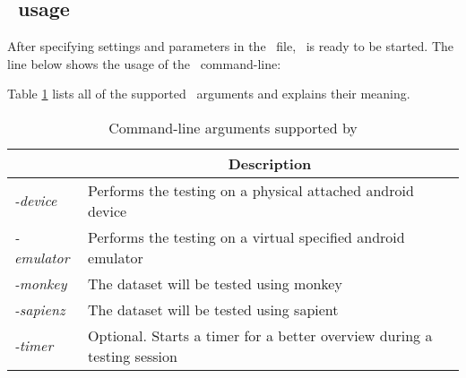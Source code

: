 \subsection{\toolname\ usage}
After specifying settings and parameters in the \Config\ file, \toolname\ is ready to be started. 
The line below shows the usage of the \toolname\ command-line: 
\begin{center}
\end{center}
Table \ref{tbl: toolarguments} lists all of the supported \toolname\ arguments and explains their meaning. 
\begin{table}[tb]
\centering
\caption{Command-line arguments supported by \toolname}
\label{tbl: toolarguments}
\begin{tabular}{|l|l|}
\hline
\rowcolor[HTML]{EFEFEF} 
\multicolumn{1}{|c|}{\cellcolor[HTML]{EFEFEF}\textbf{Supported arguments}} & \multicolumn{1}{c|}{\cellcolor[HTML]{EFEFEF}\textbf{Description}}        \\ \hline
\textit{-device}                                                           & Performs the testing on a physical attached android device               \\ \hline
\textit{-emulator}                                                         & Performs the testing on a virtual specified android emulator             \\ \hline
\textit{-monkey}                                                           & The dataset will be tested using monkey                                  \\ \hline
\textit{-sapienz}                                                          & The dataset will be tested using sapient                                 \\ \hline
\textit{-timer}                                                            & Optional.  Starts a timer for a better overview during a testing session \\ \hline
\end{tabular}
\end{table}
  


































